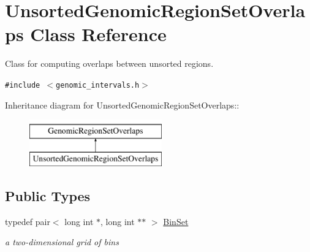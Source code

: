 \hypertarget{classUnsortedGenomicRegionSetOverlaps}{
\section{UnsortedGenomicRegionSetOverlaps Class Reference}
\label{classUnsortedGenomicRegionSetOverlaps}
}
Class for computing overlaps between unsorted regions.  


{\tt \#include $<$genomic\_\-intervals.h$>$}

Inheritance diagram for UnsortedGenomicRegionSetOverlaps::\begin{figure}[H]
\begin{center}
\leavevmode
\includegraphics[height=2cm]{classUnsortedGenomicRegionSetOverlaps}
\end{center}
\end{figure}
\subsection*{Public Types}
\begin{CompactItemize}
\item 
\hypertarget{classUnsortedGenomicRegionSetOverlaps_0f0857dd93ad3c047d1f5056a57edc14}{
typedef pair$<$ long int $\ast$, long int $\ast$$\ast$ $>$ \hyperlink{classUnsortedGenomicRegionSetOverlaps_0f0857dd93ad3c047d1f5056a57edc14}{BinSet}}
\label{classUnsortedGenomicRegionSetOverlaps_0f0857dd93ad3c047d1f5056a57edc14}

\begin{CompactList}\small\item\em a two-dimensional grid of bins \item\end{CompactList}\end{CompactItemize}
